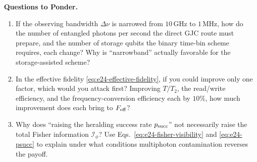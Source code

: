 \medskip
\noindent\textbf{Questions to Ponder.}
\begin{enumerate}
\item If the observing bandwidth \(\Delta\nu\) is narrowed from \(10\,\mathrm{GHz}\) to \(1\,\mathrm{MHz}\), how do the number of entangled photons per second the direct GJC route must prepare, and the number of storage qubits the binary time-bin scheme requires, each change? Why is ``narrowband'' actually favorable for the storage-assisted scheme?
\item In the effective fidelity \eqref{eq:e24-effective-fidelity}, if you could improve only one factor, which would you attack first? Improving \(T/T_2\), the read/write efficiency, and the frequency-conversion efficiency each by \(10\%\), how much improvement does each bring to \(F_{\rm eff}\)?
\item Why does ``raising the heralding success rate \(p_{\rm succ}\)'' not necessarily raise the total Fisher information \(\mathcal I_\phi\)? Use Eqs.\ \eqref{eq:e24-fisher-visibility} and \eqref{eq:e24-psucc} to explain under what conditions multiphoton contamination reverses the payoff.
\end{enumerate}

